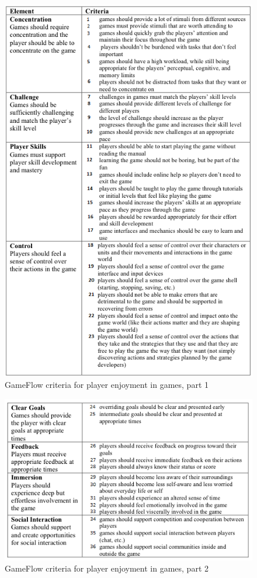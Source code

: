 \begin{figure} [ht!]
\centering
\includegraphics[scale=0.7]{gameflow1}
\caption[GameFlow criteria for player enjoyment in games, part 1]{GameFlow criteria for player enjoyment in games, part 1 \cite{sweetser}}
\label{fig:gameflow1}
\end{figure}  

\begin{figure} [ht!]
\centering
\includegraphics[scale=0.7]{gameflow2}
\caption[GameFlow criteria for player enjoyment in games, part 2]{GameFlow criteria for player enjoyment in games, part 2 \cite{sweetser}}
\label{fig:gameflow2}
\end{figure}  

